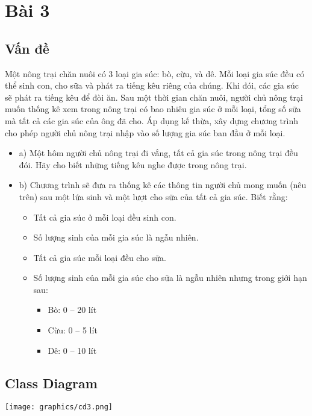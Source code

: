 \clearpage
\section{Bài 3}
\subsection{Vấn đề}
Một nông trại chăn nuôi có 3 loại gia súc: bò, cừu, và dê. Mỗi loại gia súc
đều có thể sinh con, cho sữa và phát ra tiếng kêu riêng của chúng. Khi đói, các gia súc
sẽ phát ra tiếng kêu để đòi ăn. Sau một thời gian chăn nuôi, người chủ nông trại muốn
thống kê xem trong nông trại có bao nhiêu gia súc ở mỗi loại, tổng số sữa mà tất cả các
gia súc của ông đã cho. \newline 
Áp dụng kế thừa, xây dựng chương trình cho phép người chủ nông trại nhập vào số
lượng gia súc ban đầu ở mỗi loại.
\begin{itemize}
    \item a) Một hôm người chủ nông trại đi vắng, tất cả gia súc trong nông trại đều đói. Hãy
cho biết những tiếng kêu nghe được trong nông trại.
    \item b) Chương trình sẽ đưa ra thống kê các thông tin người chủ mong muốn (nêu trên)
sau một lứa sinh và một lượt cho sữa của tất cả gia súc. Biết rằng:
    \begin{itemize}
        \item Tất cả gia súc ở mỗi loại đều sinh con.
        \item Số lượng sinh của mỗi gia súc là ngẫu nhiên.
        \item Tất cả gia súc mỗi loại đều cho sữa.
        \item Số lượng sinh của mỗi gia súc cho sữa là ngẫu nhiên nhưng trong giới hạn sau:
        \begin{itemize}
            \item Bò: 0 – 20 lít
            \item Cừu: 0 – 5 lít
            \item Dê: 0 – 10 lít
        \end{itemize}
    \end{itemize}
\end{itemize}

\subsection{Class Diagram}
\texttt{[image: graphics/cd3.png]}
